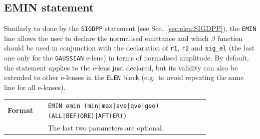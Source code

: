 \subsection{EMIN statement}\label{sec:elen:EMIN}
Similarly to done by the \texttt{SIGDPP} statement (see Sec.~\ref{sec:elen:SIGDPP}), the \texttt{EMIN} line allows the user to declare the normalised emittance and which $\beta$ function should be used in conjunction with the declaration of \texttt{r1}, \texttt{r2} and \texttt{sig\_el} (the last one only for the \texttt{GAUSSIAN} e-lens) in terms of normalised amplitude. By default, the statement applies to the e-lens just declared, but its validity can also be extended to other e-lenses in the \texttt{ELEN} block (e.g.~to avoid repeating the same line for all e-lenses).

\bigskip
\begin{tabular}{@{}lp{0.8\linewidth}}
    \textbf{Format}     & \texttt{EMIN emin (min|max|ave|qve|geo) (ALL|BEF(ORE)|AFT(ER))} \\
    & The last two parameters are optional.  \\
\end{tabular}

